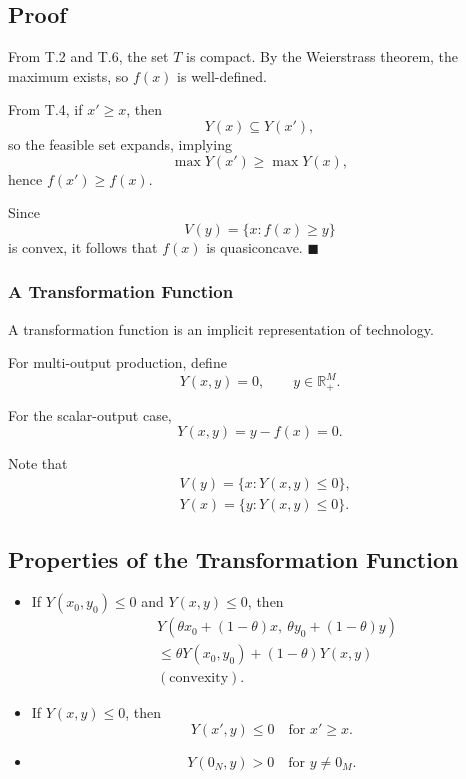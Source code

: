 \subsection*{Proof}

From T.2 and T.6, the set $T$ is compact.
By the Weierstrass theorem, the maximum exists, so $f(x)$ is well-defined.

\medskip

From T.4, if $x' \ge x$, then
\[
Y(x) \subseteq Y(x'),
\]
so the feasible set expands, implying
\[
\max Y(x') \ge \max Y(x),
\]
hence $f(x') \ge f(x)$.

\medskip

Since
\[
V(y) = \{x : f(x) \ge y\}
\]
is convex, it follows that $f(x)$ is quasiconcave.
\hfill $\blacksquare$






\subsubsection{A Transformation Function}

A transformation function is an implicit representation of technology.

For multi-output production, define
\[
Y(x,y)=0, \qquad y \in \mathbb{R}^M_+.
\]

For the scalar-output case,
\[
Y(x,y)=y - f(x)=0.
\]

\medskip

Note that
\[
\begin{aligned}
&V(y)=\{x : Y(x,y)\le 0\},\\
&Y(x)=\{y : Y(x,y)\le 0\}.
\end{aligned}
\]

\subsection*{Properties of the Transformation Function}

\begin{itemize}
    \item[J.1] If $Y(x_0,y_0)\le 0$ and $Y(x,y)\le 0$, then
    \[
    \begin{aligned}
    &Y(\theta x_0+(1-\theta)x,\ \theta y_0+(1-\theta)y)\\
    &\le
    \theta Y(x_0,y_0)+(1-\theta)Y(x,y)\\
    &(\text{convexity}).
    \end{aligned}
    \]

    \item[J.2] If $Y(x,y)\le 0$, then
    \[
    Y(x',y)\le 0 \quad \text{for } x' \ge x.
    \]

    \item[J.3] 
    \[
    Y(0_N,y)>0 \quad \text{for } y \ne 0_M.
    \]
\end{itemize}

